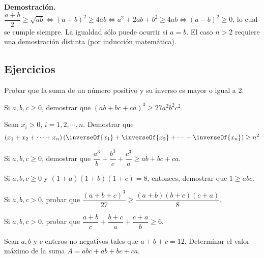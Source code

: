 \textbf{Demostración.} $\dfrac{a + b}{2} \geq \sqrt {ab} \Leftrightarrow (a + b)^2 \geq 4ab \Leftrightarrow a^2 + 2ab + b^2 \geq 4ab \Leftrightarrow (a - b)^2 \geq 0$, lo cual se cumple siempre.
La igualdad sólo puede ocurrir si $a = b$.
El caso $n > 2$ requiere una demostración distinta (por inducción matemática).

\subsection{Ejercicios}

\begin{exercise}
    Probar que la suma de un número positivo y su inverso es mayor o igual a 2.
\end{exercise}

\begin{exercise}
    Si $a, b, c \geq 0$, demostrar que $(ab + bc + ca)^3 \geq 27 a^2 b^2 c^2$.
\end{exercise}

\begin{exercise}
    Sean $x_i > 0$, $i = 1, 2, \cdots, n$.
    Demostrar que
    \begin{gather*}
    \left(x_1 + x_2 + \cdots + x_n\right)\left(\inverseOf{x_1} + \inverseOf{x_2} + \cdots + \inverseOf{x_n}\right) \geq n^2
    \end{gather*}
\end{exercise}

\begin{exercise}
    Si $a, b, c \geq 0$, demostrar que $ \dfrac{a^3}{b} + \dfrac{b^3}{c} + \dfrac{c^3}{a} \geq ab + bc + ca$.
\end{exercise}

\begin{exercise}
    Si $a, b, c \geq 0$ y $(1 + a)(1 + b)(1 + c) = 8$, entonces, demostrar que $1 \geq abc$.
\end{exercise}

\begin{exercise}
    Si $a, b, c > 0$, probar que $\dfrac{(a + b + c)^3}{27} \geq \dfrac{(a + b)(b + c)(c + a)}{8}$.
\end{exercise}

\begin{exercise}
    Si $a, b, c > 0$, probar que $\dfrac{a + b}{c} + \dfrac{b + c}{a} + \dfrac{c + a}{b} \geq 6$.
\end{exercise}

\begin{exercise}
    Sean $a, b$ y $c$ enteros no negativos tales que $a + b + c = 12$.
    Determinar el valor máximo de la suma $A = abc + ab + bc + ca$.
\end{exercise}

